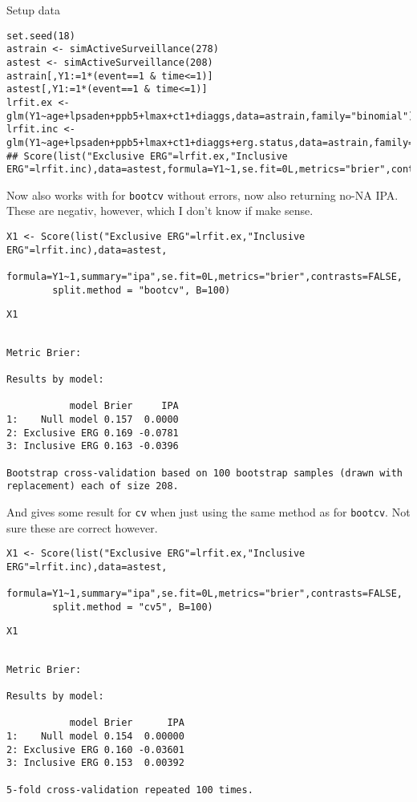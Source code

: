 \documentclass{article}
\begin{document}
Setup data
\lstset{language=r,label= ,caption= ,captionpos=b,numbers=none}
\begin{lstlisting}
set.seed(18)
astrain <- simActiveSurveillance(278)
astest <- simActiveSurveillance(208)
astrain[,Y1:=1*(event==1 & time<=1)]
astest[,Y1:=1*(event==1 & time<=1)]
lrfit.ex <- glm(Y1~age+lpsaden+ppb5+lmax+ct1+diaggs,data=astrain,family="binomial")
lrfit.inc <- glm(Y1~age+lpsaden+ppb5+lmax+ct1+diaggs+erg.status,data=astrain,family="binomial")
## Score(list("Exclusive ERG"=lrfit.ex,"Inclusive ERG"=lrfit.inc),data=astest,formula=Y1~1,se.fit=0L,metrics="brier",contrasts=FALSE)
\end{lstlisting}

Now also works with for \texttt{bootcv} without errors, now also returning no-NA IPA. These are negativ, however, which I don't know if make sense.
\lstset{language=r,label= ,caption= ,captionpos=b,numbers=none}
\begin{lstlisting}
X1 <- Score(list("Exclusive ERG"=lrfit.ex,"Inclusive ERG"=lrfit.inc),data=astest,
	    formula=Y1~1,summary="ipa",se.fit=0L,metrics="brier",contrasts=FALSE,
	    split.method = "bootcv", B=100)
\end{lstlisting}


\lstset{language=r,label= ,caption= ,captionpos=b,numbers=none}
\begin{lstlisting}
X1
\end{lstlisting}

\begin{verbatim}

Metric Brier:

Results by model:

           model Brier     IPA
1:    Null model 0.157  0.0000
2: Exclusive ERG 0.169 -0.0781
3: Inclusive ERG 0.163 -0.0396

Bootstrap cross-validation based on 100 bootstrap samples (drawn with replacement) each of size 208.
\end{verbatim}


And gives some result for \texttt{cv} when just using the same method as for \texttt{bootcv}. Not sure these are correct however.
\lstset{language=r,label= ,caption= ,captionpos=b,numbers=none}
\begin{lstlisting}
X1 <- Score(list("Exclusive ERG"=lrfit.ex,"Inclusive ERG"=lrfit.inc),data=astest,
	    formula=Y1~1,summary="ipa",se.fit=0L,metrics="brier",contrasts=FALSE,
	    split.method = "cv5", B=100)
\end{lstlisting}


\lstset{language=r,label= ,caption= ,captionpos=b,numbers=none}
\begin{lstlisting}
X1
\end{lstlisting}

\begin{verbatim}

Metric Brier:

Results by model:

           model Brier      IPA
1:    Null model 0.154  0.00000
2: Exclusive ERG 0.160 -0.03601
3: Inclusive ERG 0.153  0.00392

5-fold cross-validation repeated 100 times.
\end{verbatim}
\end{document}
